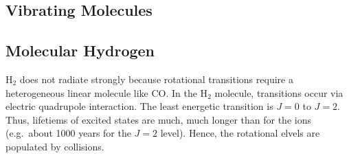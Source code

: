 \documentclass[10pt]{article}
\numberwithin{equation}{section}
\begin{document}
\subsection{Vibrating Molecules} %
\label{sub:vibrating_molecules}
\subsection{Molecular Hydrogen} %
\label{sub:molecular_hydrogen}
H$_2$ does not radiate strongly because rotational transitions require a
heterogeneous linear molecule like CO. In the H$_2$ molecule, transitions occur
via electric quadrupole interaction. The least energetic transition is $J=0$ to
$J=2$. Thus, lifetiems of excited states are much, much longer than for the
ions (e.g.\ about 1000 years for the $J=2$ level). Hence, the rotational elvels
are populated by collisions.
\end{document}
